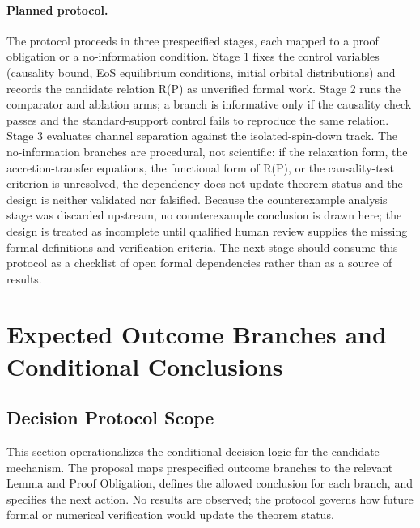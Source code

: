 \documentclass[conference]{IEEEtran}
\begin{document}
\paragraph{Planned protocol.} The protocol proceeds in three prespecified stages, each mapped to a proof obligation or a no-information condition. Stage 1 fixes the control variables (causality bound, EoS equilibrium conditions, initial orbital distributions) and records the candidate relation R(P) as unverified formal work. Stage 2 runs the comparator and ablation arms; a branch is informative only if the causality check passes and the standard-support control fails to reproduce the same relation. Stage 3 evaluates channel separation against the isolated-spin-down track. The no-information branches are procedural, not scientific: if the relaxation form, the accretion-transfer equations, the functional form of R(P), or the causality-test criterion is unresolved, the dependency does not update theorem status and the design is neither validated nor falsified. Because the counterexample analysis stage was discarded upstream, no counterexample conclusion is drawn here; the design is treated as incomplete until qualified human review supplies the missing formal definitions and verification criteria. The next stage should consume this protocol as a checklist of open formal dependencies rather than as a source of results.~\cite{cite_58f0ac6612957738}

\section{Expected Outcome Branches and Conditional Conclusions}
\subsection{Decision Protocol Scope}
This section operationalizes the conditional decision logic for the candidate mechanism. The proposal maps prespecified outcome branches to the relevant Lemma and Proof Obligation, defines the allowed conclusion for each branch, and specifies the next action. No results are observed; the protocol governs how future formal or numerical verification would update the theorem status.
\end{document}
